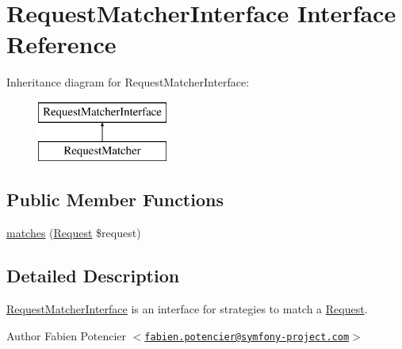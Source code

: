 \hypertarget{interface_symfony_1_1_component_1_1_http_foundation_1_1_request_matcher_interface}{
\section{\-Request\-Matcher\-Interface \-Interface \-Reference}
\label{interface_symfony_1_1_component_1_1_http_foundation_1_1_request_matcher_interface}
}
\-Inheritance diagram for \-Request\-Matcher\-Interface\-:\begin{figure}[H]
\begin{center}
\leavevmode
\includegraphics[height=2.000000cm]{interface_symfony_1_1_component_1_1_http_foundation_1_1_request_matcher_interface}
\end{center}
\end{figure}
\subsection*{\-Public \-Member \-Functions}
\begin{DoxyCompactItemize}
\item 
\hyperlink{interface_symfony_1_1_component_1_1_http_foundation_1_1_request_matcher_interface_a0b70e43609cb9ab9b5128af7b8f76a77}{matches} (\hyperlink{class_symfony_1_1_component_1_1_http_foundation_1_1_request}{\-Request} \$request)
\end{DoxyCompactItemize}


\subsection{\-Detailed \-Description}
\hyperlink{interface_symfony_1_1_component_1_1_http_foundation_1_1_request_matcher_interface}{\-Request\-Matcher\-Interface} is an interface for strategies to match a \hyperlink{class_symfony_1_1_component_1_1_http_foundation_1_1_request}{\-Request}.

\begin{DoxyAuthor}{\-Author}
\-Fabien \-Potencier $<$\href{mailto:fabien.potencier@symfony-project.com}{\tt fabien.\-potencier@symfony-\/project.\-com}$>$ 
\end{DoxyAuthor}



